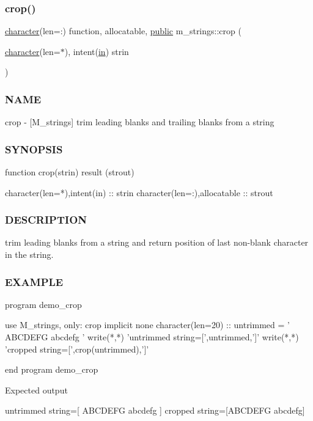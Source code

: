 \subsubsection{\texorpdfstring{crop()}{crop()}}
{\footnotesize\ttfamily \hyperlink{option__stopwatch_83_8txt_abd4b21fbbd175834027b5224bfe97e66}{character}(len=\+:) function, allocatable, \hyperlink{M__stopwatch_83_8txt_a2f74811300c361e53b430611a7d1769f}{public} m\+\_\+strings\+::crop (\begin{DoxyParamCaption}\item[{\hyperlink{option__stopwatch_83_8txt_abd4b21fbbd175834027b5224bfe97e66}{character}(len=$\ast$), intent(\hyperlink{M__journal_83_8txt_afce72651d1eed785a2132bee863b2f38}{in})}]{strin }\end{DoxyParamCaption})}



\subsubsection*{N\+A\+ME}

crop -\/ \mbox{[}M\+\_\+strings\mbox{]} trim leading blanks and trailing blanks from a string 

\subsubsection*{S\+Y\+N\+O\+P\+S\+IS}

\begin{DoxyVerb}function crop(strin) result (strout)

 character(len=*),intent(in)  :: strin
 character(len=:),allocatable :: strout
\end{DoxyVerb}


\subsubsection*{D\+E\+S\+C\+R\+I\+P\+T\+I\+ON}

trim leading blanks from a string and return position of last non-\/blank character in the string.

\subsubsection*{E\+X\+A\+M\+P\+LE}

\begin{DoxyVerb}program demo_crop

 use M_strings, only: crop
 implicit none
 character(len=20) ::  untrimmed = '   ABCDEFG abcdefg  '
    write(*,*) 'untrimmed string=[',untrimmed,']'
    write(*,*) 'cropped string=[',crop(untrimmed),']'

end program demo_crop

Expected output

  untrimmed string=[   ABCDEFG abcdefg                      ]
  cropped string=[ABCDEFG abcdefg] \end{DoxyVerb}
 \mbox{\label{namespacem__strings_ae4fac72ec3065d73aa06a107e41004b7}} 
